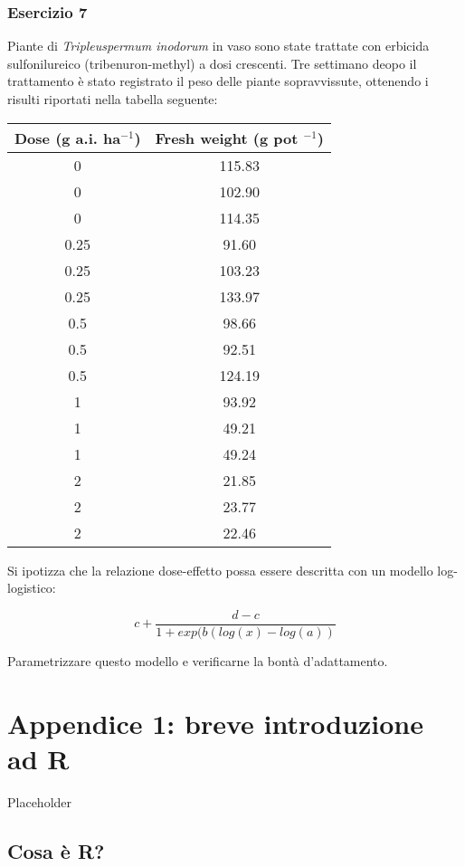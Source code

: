 \documentclass[a4paper,12pt,oneside]{book}
\begin{document}
\hypertarget{esercizio-7-2}{%
\subsection{Esercizio 7}\label{esercizio-7-2}}

Piante di \emph{Tripleuspermum inodorum} in vaso sono state trattate con erbicida sulfonilureico (tribenuron-methyl) a dosi crescenti. Tre settimano deopo il trattamento è stato registrato il peso delle piante sopravvissute, ottenendo i risulti riportati nella tabella seguente:

\begin{longtable}[]{@{}cc@{}}
\toprule
Dose (g a.i. ha\(^{-1}\)) & Fresh weight (g pot \(^{-1}\)) \\
\midrule
\endhead
0 & 115.83 \\
0 & 102.90 \\
0 & 114.35 \\
0.25 & 91.60 \\
0.25 & 103.23 \\
0.25 & 133.97 \\
0.5 & 98.66 \\
0.5 & 92.51 \\
0.5 & 124.19 \\
1 & 93.92 \\
1 & 49.21 \\
1 & 49.24 \\
2 & 21.85 \\
2 & 23.77 \\
2 & 22.46 \\
\bottomrule
\end{longtable}

Si ipotizza che la relazione dose-effetto possa essere descritta con un modello log-logistico:

\[c + \frac{d - c}{1 + exp(b ( log (x) - log (a))}\]

Parametrizzare questo modello e verificarne la bontà d'adattamento.

\hypertarget{appendice-1-breve-introduzione-ad-r}{%
\chapter{Appendice 1: breve introduzione ad R}\label{appendice-1-breve-introduzione-ad-r}}

Placeholder

\hypertarget{cosa-uxe8-r}{%
\section*{Cosa è R?}\label{cosa-uxe8-r}}
\end{document}
